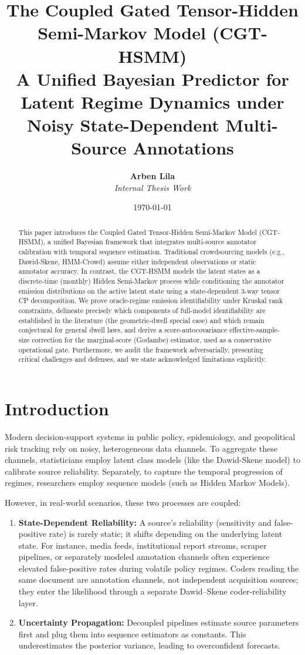 \documentclass[11pt,a4paper]{article}
\title{\textbf{The Coupled Gated Tensor-Hidden Semi-Markov Model (CGT-HSMM)}\\
\large A Unified Bayesian Predictor for Latent Regime Dynamics under Noisy State-Dependent Multi-Source Annotations}
\author{\textbf{Arben Lila} \\ \textit{Internal Thesis Work}}
\date{\today}
\begin{document}
\maketitle

\begin{abstract}
This paper introduces the Coupled Gated Tensor-Hidden Semi-Markov Model (CGT-HSMM), a unified Bayesian framework that integrates multi-source annotator calibration with temporal sequence estimation. Traditional crowdsourcing models (e.g., Dawid-Skene, HMM-Crowd) assume either independent observations or static annotator accuracy. In contrast, the CGT-HSMM models the latent states as a discrete-time (monthly) Hidden Semi-Markov process while conditioning the annotator emission distributions on the active latent state using a state-dependent 3-way tensor CP decomposition. We prove oracle-regime emission identifiability under Kruskal rank constraints, delineate precisely which components of full-model identifiability are established in the literature (the geometric-dwell special case) and which remain conjectural for general dwell laws, and derive a score-autocovariance effective-sample-size correction for the marginal-score (Godambe) estimator, used as a conservative operational gate. Furthermore, we audit the framework adversarially, presenting critical challenges and defenses, and we state acknowledged limitations explicitly. %
\end{abstract}

\tableofcontents
\newpage

\section{Introduction}
Modern decision-support systems in public policy, epidemiology, and geopolitical risk tracking rely on noisy, heterogeneous data channels. To aggregate these channels, statisticians employ latent class models (like the Dawid-Skene model) to calibrate source reliability. Separately, to capture the temporal progression of regimes, researchers employ sequence models (such as Hidden Markov Models).

However, in real-world scenarios, these two processes are coupled:
\begin{enumerate}
    \item \textbf{State-Dependent Reliability:} A source's reliability (sensitivity and false-positive rate) is rarely static; it shifts depending on the underlying latent state. For instance, media feeds, institutional report streams, scraper pipelines, or separately modeled annotation channels often experience elevated false-positive rates during volatile policy regimes. Coders reading the same document are annotation channels, not independent acquisition sources; they enter the likelihood through a separate Dawid--Skene coder-reliability layer.
    \item \textbf{Uncertainty Propagation:} Decoupled pipelines estimate source parameters first and plug them into sequence estimators as constants. This underestimates the posterior variance, leading to overconfident forecasts.
\end{enumerate}
\end{document}
